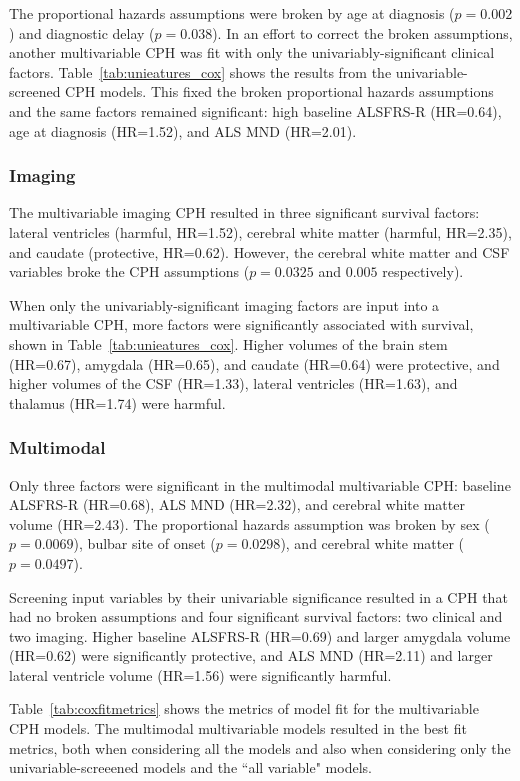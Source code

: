 The proportional hazards assumptions were broken by age at diagnosis ($p=0.002$) and diagnostic delay ($p=0.038$).
In an effort to correct the broken assumptions, another multivariable CPH was fit with only the univariably-significant clinical factors.
Table~\ref{tab:unieatures_cox} shows the results from the univariable-screened CPH models.
This fixed the broken proportional hazards assumptions and the same factors remained significant: high baseline ALSFRS-R (HR=0.64), age at diagnosis (HR=1.52), and ALS MND (HR=2.01).


\subsubsection{Imaging}
The multivariable imaging CPH resulted in three significant survival factors: lateral ventricles (harmful, HR=1.52), cerebral white matter (harmful, HR=2.35), and caudate (protective, HR=0.62).
However, the cerebral white matter and CSF variables broke the CPH assumptions ($p=0.0325$ and $0.005$ respectively).

When only the univariably-significant imaging factors are input into a multivariable CPH, more factors were significantly associated with survival, shown in Table~\ref{tab:unieatures_cox}.
Higher volumes of the brain stem (HR=0.67), amygdala (HR=0.65), and caudate (HR=0.64) were protective, and higher volumes of the CSF (HR=1.33), lateral ventricles (HR=1.63), and thalamus (HR=1.74) were harmful.

\subsubsection{Multimodal}
Only three factors were significant in the multimodal multivariable CPH: baseline ALSFRS-R (HR=0.68), ALS MND (HR=2.32), and cerebral white matter volume (HR=2.43).
The proportional hazards assumption was broken by sex ($p=0.0069$), bulbar site of onset ($p=0.0298$), and cerebral white matter ($p=0.0497$).

Screening input variables by their univariable significance resulted in a CPH that had no broken assumptions and four significant survival factors: two clinical and two imaging.
Higher baseline ALSFRS-R (HR=0.69) and larger amygdala volume (HR=0.62) were significantly protective, and ALS MND (HR=2.11) and larger lateral ventricle volume (HR=1.56) were significantly harmful.

Table~\ref{tab:coxfitmetrics} shows the metrics of model fit for the multivariable CPH models.
The multimodal multivariable models resulted in the best fit metrics, both when considering all the models and also when considering only the univariable-screeened models and the ``all variable" models.

